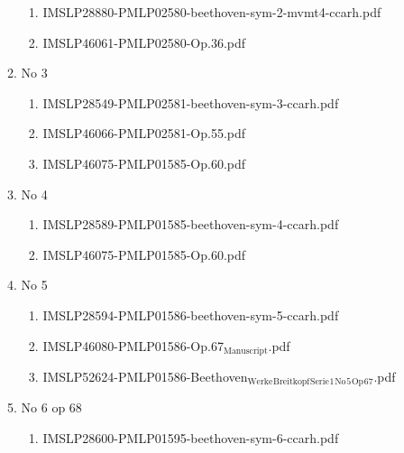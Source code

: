 \documentclass[11pt]{article}
\begin{document}
\begin{enumerate}
\begin{enumerate}
\begin{enumerate}
\item IMSLP28880-PMLP02580-beethoven-sym-2-mvmt4-ccarh.pdf
\label{sec-1-1-1-1-44-9-10-2-2}

\item IMSLP46061-PMLP02580-Op.36.pdf
\label{sec-1-1-1-1-44-9-10-2-3}
\end{enumerate}

\item No 3
\label{sec-1-1-1-1-44-9-10-3}
\begin{enumerate}
\item IMSLP28549-PMLP02581-beethoven-sym-3-ccarh.pdf
\label{sec-1-1-1-1-44-9-10-3-1}

\item IMSLP46066-PMLP02581-Op.55.pdf
\label{sec-1-1-1-1-44-9-10-3-2}

\item IMSLP46075-PMLP01585-Op.60.pdf
\label{sec-1-1-1-1-44-9-10-3-3}
\end{enumerate}

\item No 4
\label{sec-1-1-1-1-44-9-10-4}
\begin{enumerate}
\item IMSLP28589-PMLP01585-beethoven-sym-4-ccarh.pdf
\label{sec-1-1-1-1-44-9-10-4-1}

\item IMSLP46075-PMLP01585-Op.60.pdf
\label{sec-1-1-1-1-44-9-10-4-2}
\end{enumerate}

\item No 5
\label{sec-1-1-1-1-44-9-10-5}
\begin{enumerate}
\item IMSLP28594-PMLP01586-beethoven-sym-5-ccarh.pdf
\label{sec-1-1-1-1-44-9-10-5-1}

\item IMSLP46080-PMLP01586-Op.67$_{\text{Manuscript}}$.pdf
\label{sec-1-1-1-1-44-9-10-5-2}

\item IMSLP52624-PMLP01586-Beethoven$_{\text{Werke}}$$_{\text{Breitkopf}}$$_{\text{Serie}}$$_{\text{1}}$$_{\text{No}}$$_{\text{5}}$$_{\text{Op}}$$_{\text{67}}$.pdf
\label{sec-1-1-1-1-44-9-10-5-3}
\end{enumerate}

\item No 6 op 68
\label{sec-1-1-1-1-44-9-10-6}
\begin{enumerate}
\item IMSLP28600-PMLP01595-beethoven-sym-6-ccarh.pdf
\label{sec-1-1-1-1-44-9-10-6-1}


\end{enumerate}
\end{enumerate}
\end{enumerate}
\end{document}
